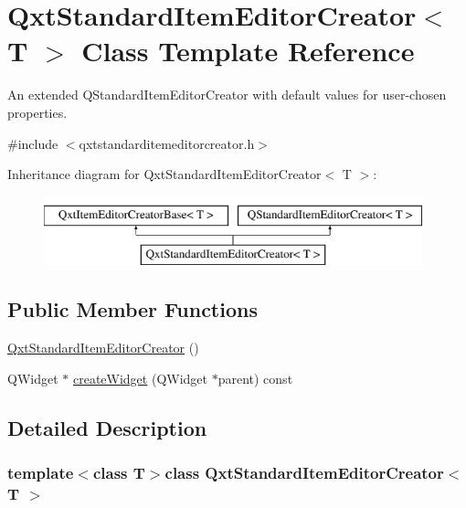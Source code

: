 \hypertarget{class_qxt_standard_item_editor_creator}{\section{Qxt\-Standard\-Item\-Editor\-Creator$<$ T $>$ Class Template Reference}
\label{class_qxt_standard_item_editor_creator}
}


An extended Q\-Standard\-Item\-Editor\-Creator with default values for user-\/chosen properties.  




{\ttfamily \#include $<$qxtstandarditemeditorcreator.\-h$>$}

Inheritance diagram for Qxt\-Standard\-Item\-Editor\-Creator$<$ T $>$\-:\begin{figure}[H]
\begin{center}
\leavevmode
\includegraphics[height=2.000000cm]{class_qxt_standard_item_editor_creator}
\end{center}
\end{figure}
\subsection*{Public Member Functions}
\begin{DoxyCompactItemize}
\item 
\hyperlink{class_qxt_standard_item_editor_creator_ac238d651da7721e08730fc50c94dd131}{Qxt\-Standard\-Item\-Editor\-Creator} ()
\item 
Q\-Widget $\ast$ \hyperlink{class_qxt_standard_item_editor_creator_a653acff7c229e2902ec066bdabb9fbf3}{create\-Widget} (Q\-Widget $\ast$parent) const 
\end{DoxyCompactItemize}


\subsection{Detailed Description}
\subsubsection*{template$<$class T$>$class Qxt\-Standard\-Item\-Editor\-Creator$<$ T $>$}


